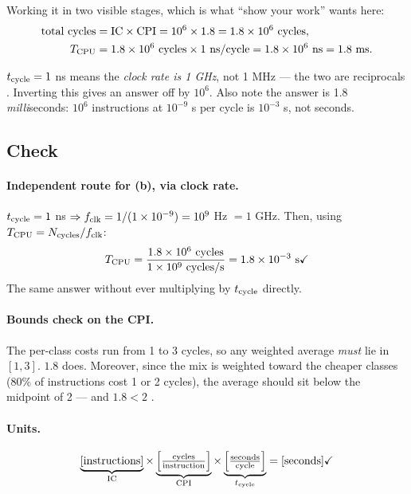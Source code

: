 Working it in two visible stages, which is what ``show your work'' wants here:
\begin{align}
  \text{total cycles} &= \IC \times \CPI = 10^{6} \times 1.8
                       = 1.8\times10^{6}\ \text{cycles}, \\
  \CPUtime &= 1.8\times10^{6}\ \text{cycles} \times 1\ \text{ns/cycle}
            = 1.8\times10^{6}\ \text{ns} = 1.8\ \text{ms.}
\end{align}

\begin{trap}
$t_{\mathrm{cycle}} = 1$ ns means the \emph{clock rate is 1 GHz}, not 1 MHz --- the two
are reciprocals . Inverting this gives an answer off
by $10^{6}$. Also note the answer is 1.8 \emph{milli}seconds: $10^{6}$
instructions at $10^{-9}$ s per cycle is $10^{-3}$ s, not seconds.
\end{trap}

\subsection*{Check}

\paragraph{Independent route for (b), via clock rate.}
$t_{\mathrm{cycle}} = 1$ ns $\Rightarrow f_{\mathrm{clk}} = 1/(1\times10^{-9}) = 10^{9}$ Hz
$= 1$ GHz. Then, using $T_{\mathrm{CPU}} = N_{\mathrm{cycles}}/f_{\mathrm{clk}}$:
\begin{equation}
  T_{\mathrm{CPU}} = \frac{1.8\times10^{6}\ \text{cycles}}{1\times10^{9}\ \text{cycles/s}}
           = 1.8\times10^{-3}\ \text{s} \checkmark
\end{equation}
The same answer without ever multiplying by $t_{\mathrm{cycle}}$ directly.

\paragraph{Bounds check on the CPI.}
The per-class costs run from 1 to 3 cycles, so any weighted average \emph{must}
lie in $[1, 3]$. $1.8$ does. Moreover, since the mix is weighted toward the
cheaper classes (80\% of instructions cost 1 or 2 cycles), the average should sit
below the midpoint of 2 --- and $1.8 < 2$ \checkmark.

\paragraph{Units.}
$$\underbrace{[\text{instructions}]}_{\mathrm{IC}} \times
  \underbrace{\left[\tfrac{\text{cycles}}{\text{instruction}}\right]}_{\mathrm{CPI}} \times
  \underbrace{\left[\tfrac{\text{seconds}}{\text{cycle}}\right]}_{t_{\mathrm{cycle}}}
  = [\text{seconds}] \checkmark$$

